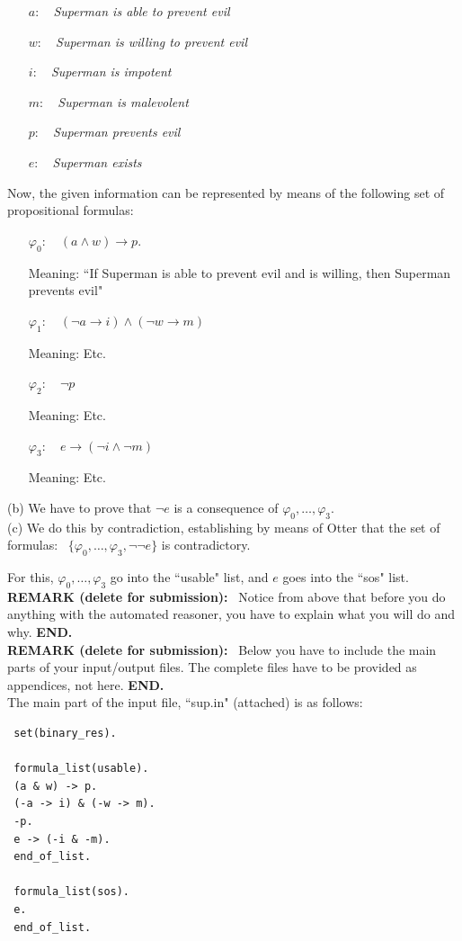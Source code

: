 \documentclass[fullpage]{article}
\newcommand{\comlb}[1]{{\vspace{2mm}\noindent \bf REMARK (delete for submission):}~ #1 \hfill {\bf
    END.}\\}
\begin{document}
\begin{itemize}
\item[$a$:]~ {\em Superman is able to prevent evil}
\item[$w$:]~ {\em Superman is willing to prevent evil}
\item[$i$:]~ {\em Superman is impotent}
\item[$m$:]~ {\em Superman is malevolent}
\item[$p$:]~ {\em Superman prevents evil}
\item[$e$:]~ {\em Superman exists}
\end{itemize}
Now, the given information can be represented by means of the following set of propositional formulas:
\begin{itemize}
\item[$\varphi_0$:]~ ${(a \wedge w) \rightarrow p}$.

 Meaning: ``If Superman is able to prevent evil and is willing, then Superman prevents evil"
\item[$\varphi_1$:]~ ${(\neg a \rightarrow i) \wedge (\neg w
    \rightarrow m)}$

     Meaning: Etc.
\item[$\varphi_2$:]~ ${\neg p}$

 Meaning: Etc.
\item[$\varphi_3$:]~ ${e \rightarrow (\neg i \wedge \neg m)}$

 Meaning: Etc.
\end{itemize}
(b) We have to prove that $\neg e$ is a consequence of $\varphi_0, \ldots, \varphi_3$.\\

\noindent
(c) We do this by contradiction, establishing by means of Otter that the set of formulas: \ $\{\varphi_0, \ldots, \varphi_3, \neg \neg e\}$ is contradictory.

For this, $\varphi_0, \ldots, \varphi_3$ go into the ``usable" list, and $e$ goes into the ``sos" list.\\

\comlb{Notice from above that before you do anything with the automated reasoner, you have to explain what you will do and why.} 

\comlb{Below you have to include the main parts of your input/output files. The complete files have to be provided as appendices, not here.}

The main part of the input file, ``sup.in" (attached) is as follows:

{\small
\begin{verbatim}
 set(binary_res).

 formula_list(usable).
 (a & w) -> p.
 (-a -> i) & (-w -> m).
 -p.
 e -> (-i & -m).
 end_of_list.

 formula_list(sos).
 e.
 end_of_list.
 \end{verbatim}
}
\end{document}
